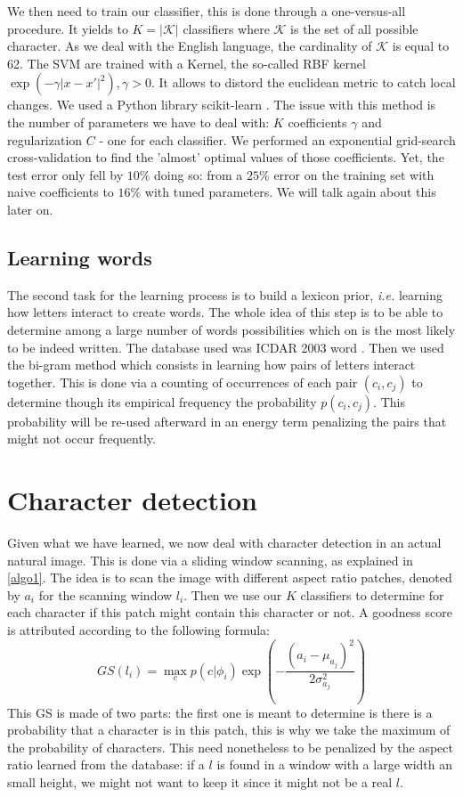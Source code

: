 \documentclass[10pt,a4paper]{article}
\begin{document}
We then need to train our classifier, this is done through a one-versus-all procedure. It yields to $K = |\mathcal{K}|$ classifiers where $\mathcal{K}$ is the set of all possible character. As we deal with the English language, the cardinality of $\mathcal{K}$ is equal to 62. The SVM are trained with a Kernel, the so-called RBF kernel $\exp(-\gamma |x-x'|^2), \gamma > 0$. It allows to distord the euclidean metric to catch local changes. We used a Python library scikit-learn \cite{scikit}. The issue with this method is the number of parameters we have to deal with: $K$ coefficients $\gamma$ and regularization $C$ - one for each classifier. We performed an exponential grid-search cross-validation to find the 'almost' optimal values of those coefficients. Yet, the test error only fell by $10\%$ doing so: from a $25\%$ error on the training set with naive coefficients to $16\%$ with tuned parameters. We will talk again about this later on. 


\subsection{Learning words}

The second task for the learning process is to build a lexicon prior, \emph{i.e.} learning how letters interact to create words. The whole idea of this step is to be able to determine among a large number of words possibilities which on is the most likely to be indeed written. The database used was ICDAR 2003 word \cite{ICDARword}. Then we used the bi-gram method which consists in learning how pairs of letters interact together. This is done via a counting of occurrences of each pair $(c_i,c_j)$ to determine though its empirical frequency the probability $p(c_i,c_j)$. This probability will be re-used afterward in an energy term penalizing the pairs that might not occur frequently. 




\section{Character detection}

Given what we have learned, we now deal with character detection in an actual natural image. This is done via a sliding window scanning, as explained in \ref{algo1}. The idea is to scan the image with different aspect ratio patches, denoted by $a_i$ for the scanning window $l_i$. Then we use our $K$ classifiers to determine for each character if this patch might contain this character or not. A goodness score is attributed according to the following formula:
\begin{equation}
GS(l_i) = \max_c p(c|\phi_i) \exp\left( - \frac{(a_i - \mu_{a_j})^2}{2\sigma_{a_j}^2} \right)
\label{eq:}
\end{equation}
This GS is made of two parts: the first one is meant to determine is there is a probability that a character is in this patch, this is why we take the maximum of the probability of characters. This need nonetheless to be penalized by the aspect ratio learned from the database: if a $l$ is found in a window with a large width an small height, we might not want to keep it since it might not be a real $l$. \\
\end{document}
